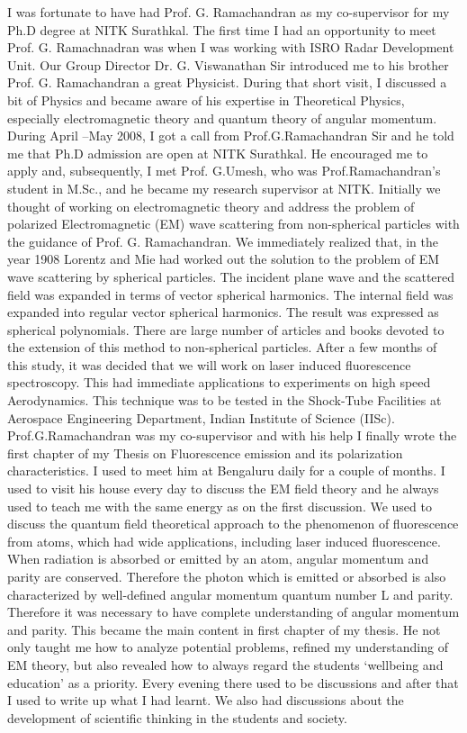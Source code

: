 I was fortunate to have had Prof. G. Ramachandran as my co-supervisor for my Ph.D degree at NITK Surathkal. The first time I had an opportunity to meet Prof. G. Ramachnadran was when I was working with ISRO Radar Development Unit. Our Group Director Dr. G. Viswanathan Sir introduced me to his brother Prof. G. Ramachandran a great Physicist. During that short visit, I discussed a bit of Physics and became aware of his expertise in Theoretical Physics, especially electromagnetic theory and quantum theory of angular momentum. During April –May 2008, I got a call from Prof.G.Ramachandran Sir and he told me that Ph.D admission are open at NITK Surathkal. He encouraged me to apply and, subsequently, I met Prof. G.Umesh, who was Prof.Ramachandran’s student in M.Sc., and he became my research supervisor at NITK. Initially we thought of working on electromagnetic theory and address the problem of polarized Electromagnetic (EM) wave scattering from non-spherical particles with the guidance of Prof. G. Ramachandran. We immediately realized that, in the year 1908 Lorentz and Mie had worked out the solution to the problem of EM wave scattering by spherical particles. The incident plane wave and the scattered field was expanded in terms of vector spherical harmonics. The internal field was expanded into regular vector spherical harmonics. The result was expressed as spherical polynomials. There are large number of articles and books devoted to the extension of this method to non-spherical particles. After a few months of this study, it was decided that we will work on  laser induced fluorescence spectroscopy. This had immediate applications to experiments on high speed Aerodynamics. This technique was to be tested in the Shock-Tube Facilities at Aerospace Engineering Department, Indian Institute of Science (IISc). Prof.G.Ramachandran was my co-supervisor and with his help I finally wrote the first chapter of my Thesis on Fluorescence emission and its polarization characteristics. I used to meet him at Bengaluru daily for a couple of months. I used to visit his house every day to discuss the EM field theory and he always used to teach me  with the same energy as on the first discussion. We used to discuss the quantum field theoretical approach to the phenomenon of fluorescence from atoms, which had wide applications, including laser induced fluorescence. When radiation is absorbed or emitted by an atom, angular momentum and parity are conserved. Therefore the photon which is emitted or absorbed is also characterized by well-defined angular momentum quantum number L and parity. Therefore it was necessary to have complete understanding of angular momentum and parity. This became the main content in first chapter of my thesis. He not only taught me how to analyze potential problems, refined my understanding of EM theory, but also revealed how to always regard the students ‘wellbeing and education’ as a priority. Every evening there used to be discussions and after that I used to write up what I had learnt. We also had discussions about the development of scientific thinking in the students and society.

